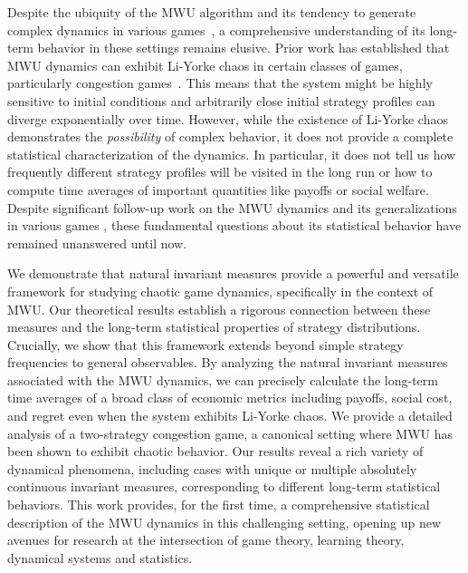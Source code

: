 \documentclass[format=acmsmall, authorversion, screen=true]{acmart}
\begin{document}
Despite the ubiquity of the MWU algorithm and its tendency to generate complex dynamics in various games~\cite{chotibut2021family,lin2024no,palaiopanos2017multiplicative,bailey2018multiplicative,cheung2020chaos,cheung2022evolution,piliouras2023multi}, a comprehensive understanding of its long-term behavior in these settings remains elusive. Prior work has established that MWU dynamics can exhibit Li-Yorke chaos in certain classes of games, particularly congestion games~\cite{palaiopanos2017multiplicative,chotibut2021family,CFMP2019}. This means that the system might be highly sensitive to initial conditions and arbitrarily close initial strategy profiles can diverge exponentially over time. However, while the existence of Li-Yorke chaos demonstrates the \textit{possibility} of complex behavior, it does not provide a complete statistical characterization of the dynamics. In particular, it does not tell us how frequently different strategy profiles will be visited in the long run or how to compute time averages of important quantities like payoffs or social welfare. Despite significant follow-up work on the MWU dynamics and its generalizations in various games \cite{bielawski2021follow,bielawski2024memory,bielawski2025heterogeneity}, these fundamental questions about its statistical behavior have remained unanswered until now.

We demonstrate that natural invariant measures provide a powerful and versatile framework for studying chaotic game dynamics, specifically in the context of MWU. Our theoretical results establish a rigorous connection between these measures and the long-term statistical properties of strategy distributions. Crucially, we show that this framework extends beyond simple strategy frequencies to general observables. By analyzing the natural invariant measures associated with the MWU dynamics, we can precisely calculate the long-term time averages of a broad class of economic metrics including payoffs, social cost, and regret even when the system exhibits Li-Yorke chaos. We provide a detailed analysis of a two-strategy congestion game, a canonical setting where MWU has been shown to exhibit chaotic behavior. Our results reveal a rich variety of dynamical phenomena, including cases with unique or multiple absolutely continuous invariant measures, corresponding to different long-term statistical behaviors. This work provides, for the first time, a comprehensive statistical description of the MWU dynamics in this challenging setting, opening up new avenues for research at the intersection of game theory, learning theory, dynamical systems and statistics.
\end{document}
